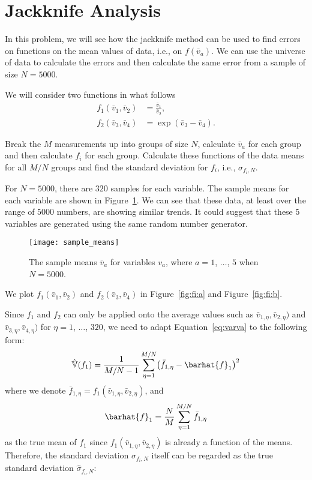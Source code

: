\section{Jackknife Analysis}

In this problem, we will see how the jackknife method can be used to find errors on functions
on the mean values of data, i.e., on \(f(\bar{v}_a)\).
We can use the universe of data to calculate
the errors and then calculate the same error from a sample of size \(N = 5000\).

We will consider two functions in what follows
%
\begin{align}
    f_1(\bar{v}_1, \bar{v}_2) & = \frac{ \bar{v}_1 }{ \bar{v}_2 }, \\
    f_2(\bar{v}_3, \bar{v}_4) & = \exp( \bar{v}_3 - \bar{v}_4 ).
\end{align}

 Break the \(M\) measurements up into groups of size \(N\), calculate
\(\bar{v}_a\) for each group and then calculate \(f_i\) for each group.
Calculate these functions of the data means for all \(M/N\) groups and find the
standard deviation for \(f_i\), i.e., \(\hat{\sigma}_{f_i,N}\).

\Answer{}
For \(N = 5000\), there are \(320\) samples for each variable.
The sample means for each variable are shown in Figure~\ref{fig:sample_means}.
We can see that these data, at least over the range of \(5000\) numbers,
are showing similar trends.
It could suggest that these \(5\) variables are generated using the same random
number generator.

\begin{figure}[h]
    \centering
    \texttt{[image: sample\_means]}
    \caption{The sample means \(\bar{v}_a\) for variables \(v_a\), where
        \(a = 1\), \(\ldots\), \(5\) when \(N = 5000\).}
    \label{fig:sample_means}
\end{figure}

We plot \(f_1(\bar{v}_1, \bar{v}_2)\) and \(f_2(\bar{v}_3, \bar{v}_4)\) in
Figure~\ref{fig:fi:a} and Figure~\ref{fig:fi:b}.

Since \(f_1\) and \(f_2\) can only be applied onto the average values such as
\(\bar{v}_{1,\eta}, \bar{v}_{2,\eta})\) and \(\bar{v}_{3,\eta}, \bar{v}_{4,\eta})\)
for \(\eta = 1\), \(\ldots\), \(320\), we need to adapt Equation~\eqref{eq:varva}
to the following form:
%
\begin{equation}
    \hat{\mathbb{V}}(f_1) = \frac{ 1 }{ M / N - 1 }
    \sum_{\eta=1}^{M/N} \bigl( \bar{f}_{1,\eta} - \barhat{f}_1 \bigr)^2
\end{equation}
%
where we denote \(\bar{f}_{1,\eta} = f_1(\bar{v}_{1,\eta}, \bar{v}_{2,\eta})\),
and
%
\begin{equation}
    \barhat{f}_1 = \frac{ N }{ M } \sum_{\eta=1}^{M/N} \bar{f}_{1,\eta}
\end{equation}
as the true mean of \(f_1\)
since \(f_1(\bar{v}_{1,\eta}, \bar{v}_{2,\eta})\) is already a function of the means.
Therefore, the standard deviation \(\sigma_{f_i,N}\) itself can be regarded
as the true standard deviation \(\hat{\sigma}_{f_i,N}\):

